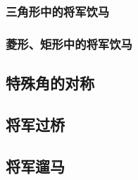 \subsubsection{三角形中的将军饮马}
\subsubsection{菱形、矩形中的将军饮马}

\subsection{特殊角的对称}
\subsection{将军过桥}
\subsection{将军遛马}















